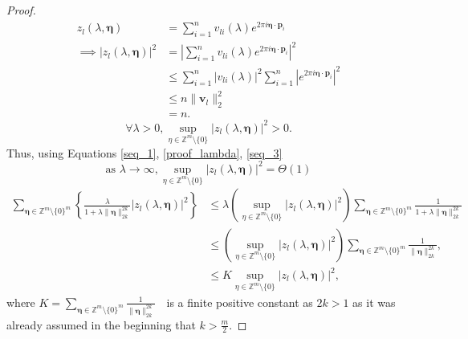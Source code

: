 \documentclass[multixcb]{amstext-l}
\theoremstyle{plain}
\theoremstyle{definition}
\theoremstyle{definition}
\theoremstyle{remark}
\numberwithin{equation}{chapter}
\begin{document}
\begin{proof}
\begin{equation}
\begin{aligned}
    z_l(\lambda,\boldsymbol{\eta}) &= \sum\limits_{i=1}^n v_{li}(\lambda) e^{2\pi i \boldsymbol{\eta}\cdot\boldsymbol{p}_i }\\
    \implies \left|z_l(\lambda,\boldsymbol{\eta})\right|^2 &=  \left|\sum\limits_{i=1}^n v_{li}(\lambda) e^{2\pi i \boldsymbol{\eta}\cdot\boldsymbol{p}_i } \right|^2\\
    &\le\sum\limits_{i=1}^n \left| v_{li}(\lambda)\right|^2            \sum\limits_{i=1}^n \left|e^{2\pi i \boldsymbol{\eta}\cdot\boldsymbol{p}_i }  \right|^2\\ 
    &\le n\|\boldsymbol{v}_l\|_2^2\\
    &=n.
\end{aligned}
\end{equation}
\begin{equation}\label{seq_3}
\forall \lambda>0, \sup\limits_{\eta\in\mathbb{Z}^m\setminus\{0\}} \left| z_l(\lambda,\boldsymbol{\eta})  \right|^2 > 0.
\end{equation}
Thus, using Equations \ref{seq_1}, \ref{proof_lambda}, \ref{seq_3} \begin{equation}\label{eq_label}
\mbox{as   } \lambda\to\infty, \sup\limits_{\eta\in\mathbb{Z}^m\setminus\{0\}} \left| z_l(\lambda,\boldsymbol{\eta})  \right|^2 = \Theta(1)
\end{equation}
\begin{equation}\label{eq_proof_eig}
\begin{aligned}
\sum_{\boldsymbol{\eta}\in\mathbb{Z}^m\setminus\{0\}^m}\left\{ \frac{\lambda}{1+\lambda\|\boldsymbol{\eta}\|_{2k}^{2k}}\left|z_l(\lambda,\boldsymbol{\eta})\right|^2 \right\} &\le \lambda \left(\sup\limits_{\eta\in\mathbb{Z}^m\setminus\{0\}} \left| z_l(\lambda,\boldsymbol{\eta})  \right|^2\right) \sum_{\boldsymbol{\eta}\in\mathbb{Z}^m\setminus\{0\}^m}\frac{1}{1+\lambda\|\boldsymbol{\eta}\|_{2k}^{2k}} \\
&\le \left(\sup\limits_{\eta\in\mathbb{Z}^m\setminus\{0\}} \left| z_l(\lambda,\boldsymbol{\eta})  \right|^2\right) \sum_{\boldsymbol{\eta}\in\mathbb{Z}^m\setminus\{0\}^m}\frac{1}{\|\boldsymbol{\eta}\|_{2k}^{2k}}, \\
&\le K \sup\limits_{\eta\in\mathbb{Z}^m\setminus\{0\}} \left| z_l(\lambda,\boldsymbol{\eta})  \right|^2,
\end{aligned}
\end{equation} where $K = \sum\limits_{\boldsymbol{\eta}\in\mathbb{Z}^m\setminus\{0\}^m}\frac{1}{\|\boldsymbol{\eta}\|_{2k}^{2k}} \mbox{            }$ is a finite positive constant as $2k>1$ as it was already assumed in the beginning that $k>\frac{m}{2}$.


\end{proof}
\end{document}
